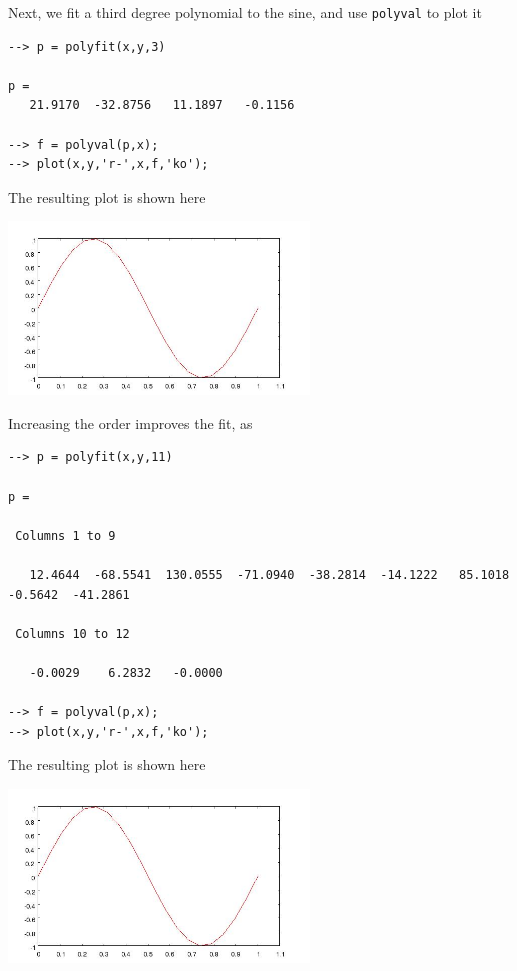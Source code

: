 Next, we fit a third degree polynomial to the sine, and use
\verb|polyval| to plot it
\begin{verbatim}
--> p = polyfit(x,y,3)

p = 
   21.9170  -32.8756   11.1897   -0.1156 

--> f = polyval(p,x);
--> plot(x,y,'r-',x,f,'ko');
\end{verbatim}
The resulting plot is shown here


\centerline{\includegraphics[width=8cm]{polyfit2}}

Increasing the order improves the fit, as
\begin{verbatim}
--> p = polyfit(x,y,11)

p = 

 Columns 1 to 9

   12.4644  -68.5541  130.0555  -71.0940  -38.2814  -14.1222   85.1018   -0.5642  -41.2861 

 Columns 10 to 12

   -0.0029    6.2832   -0.0000 

--> f = polyval(p,x);
--> plot(x,y,'r-',x,f,'ko');
\end{verbatim}
The resulting plot is shown here


\centerline{\includegraphics[width=8cm]{polyfit3}}

